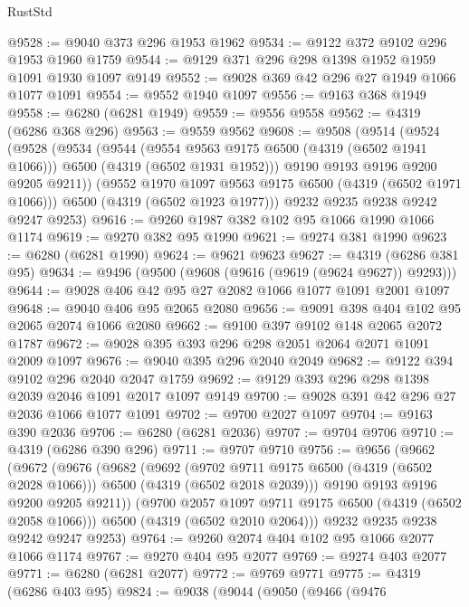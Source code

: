 \begin{lexlean}{RustStd}
\begin{coremodule}
@9528 := @9040 @373 @296 @1953 @1962
@9534 := @9122 @372 @9102 @296 @1953 @1960 @1759
@9544 := @9129 @371 @296 @298 @1398 @1952 @1959 @1091 @1930 @1097 @9149
@9552 := @9028 @369 @42 @296 @27 @1949 @1066 @1077 @1091
@9554 := @9552 @1940 @1097
@9556 := @9163 @368 @1949
@9558 := @6280 (@6281 @1949)
@9559 := @9556 @9558
@9562 := @4319 (@6286 @368 @296)
@9563 := @9559 @9562
@9608 := @9508
    (@9514
      (@9524
        (@9528
          (@9534
            (@9544
              (@9554 @9563 @9175 @6500 (@4319 (@6502 @1941 @1066)))
              @6500
              (@4319 (@6502 @1931 @1952)))
            @9190
            @9193
            @9196
            @9200
            @9205
            @9211))
        (@9552 @1970 @1097 @9563 @9175 @6500 (@4319 (@6502 @1971 @1066)))
        @6500
        (@4319 (@6502 @1923 @1977)))
      @9232
      @9235
      @9238
      @9242
      @9247
      @9253)
@9616 := @9260 @1987 @382 @102 @95 @1066 @1990 @1066 @1174
@9619 := @9270 @382 @95 @1990
@9621 := @9274 @381 @1990
@9623 := @6280 (@6281 @1990)
@9624 := @9621 @9623
@9627 := @4319 (@6286 @381 @95)
@9634 := @9496 (@9500 (@9608 (@9616 (@9619 (@9624 @9627)) @9293)))
@9644 := @9028 @406 @42 @95 @27 @2082 @1066 @1077 @1091 @2001 @1097
@9648 := @9040 @406 @95 @2065 @2080
@9656 := @9091 @398 @404 @102 @95 @2065 @2074 @1066 @2080
@9662 := @9100 @397 @9102 @148 @2065 @2072 @1787
@9672 := @9028 @395 @393 @296 @298 @2051 @2064 @2071 @1091 @2009 @1097
@9676 := @9040 @395 @296 @2040 @2049
@9682 := @9122 @394 @9102 @296 @2040 @2047 @1759
@9692 := @9129 @393 @296 @298 @1398 @2039 @2046 @1091 @2017 @1097 @9149
@9700 := @9028 @391 @42 @296 @27 @2036 @1066 @1077 @1091
@9702 := @9700 @2027 @1097
@9704 := @9163 @390 @2036
@9706 := @6280 (@6281 @2036)
@9707 := @9704 @9706
@9710 := @4319 (@6286 @390 @296)
@9711 := @9707 @9710
@9756 := @9656
    (@9662
      (@9672
        (@9676
          (@9682
            (@9692
              (@9702 @9711 @9175 @6500 (@4319 (@6502 @2028 @1066)))
              @6500
              (@4319 (@6502 @2018 @2039)))
            @9190
            @9193
            @9196
            @9200
            @9205
            @9211))
        (@9700 @2057 @1097 @9711 @9175 @6500 (@4319 (@6502 @2058 @1066)))
        @6500
        (@4319 (@6502 @2010 @2064)))
      @9232
      @9235
      @9238
      @9242
      @9247
      @9253)
@9764 := @9260 @2074 @404 @102 @95 @1066 @2077 @1066 @1174
@9767 := @9270 @404 @95 @2077
@9769 := @9274 @403 @2077
@9771 := @6280 (@6281 @2077)
@9772 := @9769 @9771
@9775 := @4319 (@6286 @403 @95)
@9824 := @9038
    (@9044
      (@9050
        (@9466
          (@9476

\end{coremodule}
\end{lexlean}
